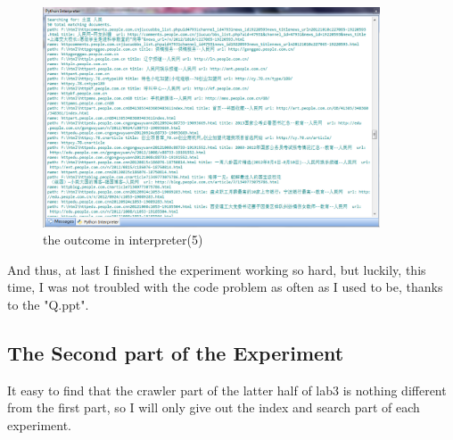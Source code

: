 \documentclass{article}
\begin{document}
\begin{figure}[htbp]
\centering
\includegraphics[width=10cm]{9.png}
\caption{the outcome in interpreter(5)}
\end{figure}
And thus, at last I finished the experiment working so hard, but luckily, this time, I was not troubled with the code problem as often as I used to be, thanks to the "Q.ppt".
\subsection{The Second part of the Experiment}
It easy to find that the crawler part of the latter half of lab3 is nothing different from the first part, so I will only give out the index and search part of each experiment.
\end{document}

